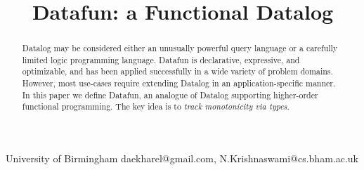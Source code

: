 \documentclass[preprint]{sigplanconf}
\begin{document}
\setlength{\pdfpageheight}{\paperheight}
\setlength{\pdfpagewidth}{\paperwidth}





\title{Datafun: a Functional Datalog}
\subtitle{}

           {University of Birmingham}
           {daekharel@gmail.com, N.Krishnaswami@cs.bham.ac.uk}

\maketitle


\begin{abstract}
  Datalog may be considered either an unusually powerful query language or a
  carefully limited logic programming language. Datafun is declarative,
  expressive, and optimizable, and has been applied successfully in a wide
  variety of problem domains. However, most use-cases require extending Datalog
  in an application-specific manner. In this paper we define Datafun, an
  analogue of Datalog supporting higher-order functional programming. The key
  idea is to \emph{track monotonicity via types}.

\end{abstract}


%
%





\end{document}
